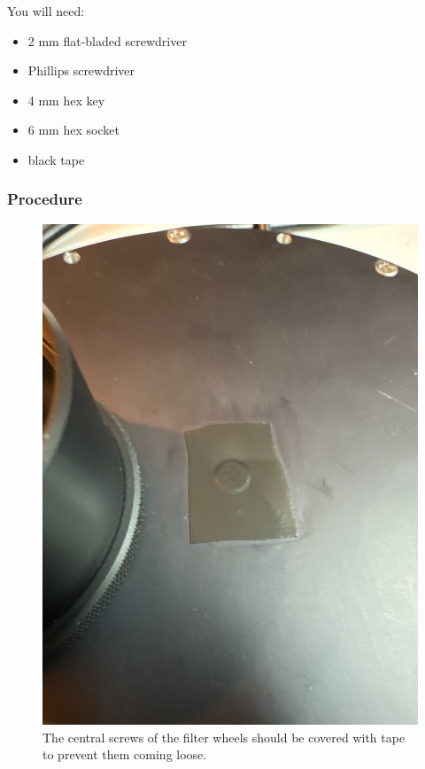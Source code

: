 You will need:

\begin{itemize}
    \item 2 mm flat-bladed screwdriver
    \item Phillips screwdriver
    \item 4 mm hex key
    \item 6 mm hex socket
    \item black tape
\end{itemize}

\subsubsection{Procedure}

\begin{figure}
\begin{center}
\includegraphics[angle=0,width=0.8\linewidth]{figures/huitzi-f20-filter-wheel-tape}
\end{center}
\caption{The central screws of the filter wheels should be covered with tape to prevent them coming loose.}
\label{figure:huitzi-f20-filter-wheel-tape}
\end{figure}
 
